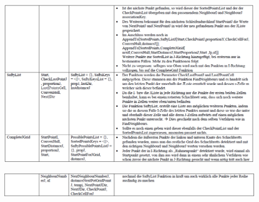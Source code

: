 \begin{minipage}{\linewidth}
	\centering
	\includegraphics[width=1\linewidth]{images/KD4.png}
\end{minipage}
\begin{minipage}{\linewidth}
	\centering
	\includegraphics[width=1\linewidth]{images/KD5.png}
\end{minipage}\\


